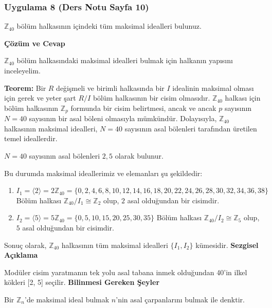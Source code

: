 \documentclass[11pt, a4paper]{article}
\newenvironment{cozum}{
    \vspace{0.5cm}
    \noindent\textcolor{green!60!black}{\faCheckCircle\enspace \textbf{\Large Çözüm ve Cevap}}\par\vspace{0.2cm}
}{}
\newenvironment{sezgisel}{
    \vspace{0.5cm}
    \noindent\textcolor{orange!80!black}{\faLightbulb\enspace \textbf{\Large Sezgisel Açıklama}}\par\vspace{0.2cm}
    \itshape
}{}
\newenvironment{bilgi}{
    \vspace{0.5cm}
    \noindent\textcolor{red!70!black}{\faExclamationTriangle\enspace \textbf{\Large Bilinmesi Gereken Şeyler}}\par\vspace{0.2cm}
}{}
\begin{document}
\subsubsection{Uygulama 8 (Ders Notu Sayfa 10)}
\begin{sorubox}
$\mathbb{Z}_{40}$ bölüm halkasının içindeki tüm maksimal idealleri bulunuz.
\end{sorubox}
\begin{cozum}
$\mathbb{Z}_{40}$ bölüm halkasındaki maksimal idealleri bulmak için halkanın yapısını inceleyelim.

\textbf{Teorem:} Bir $R$ değişmeli ve birimli halkasında bir $I$ idealinin maksimal olması için gerek ve yeter şart $R/I$ bölüm halkasının bir cisim olmasıdır. $\mathbb{Z}_{40}$ halkası için bölüm halkasının $\mathbb{Z}_p$ formunda bir cisim belirtmesi, ancak ve ancak $p$ sayısının $N = 40$ sayısının bir asal böleni olmasıyla mümkündür. Dolayısıyla, $\mathbb{Z}_{40}$ halkasının maksimal idealleri, $N = 40$ sayısının asal bölenleri tarafından üretilen temel ideallerdir.

$N = 40$ sayısının asal bölenleri $2, 5$ olarak bulunur.

Bu durumda maksimal ideallerimiz ve elemanları şu şekildedir:
\begin{enumerate}
    \item $I_{1} = \langle 2 \rangle = 2\mathbb{Z}_{40} = \{0, 2, 4, 6, 8, 10, 12, 14, 16, 18, 20, 22, 24, 26, 28, 30, 32, 34, 36, 38\}$
    Bölüm halkası $\mathbb{Z}_{40} / I_{1} \cong \mathbb{Z}_{2}$ olup, $2$ asal olduğundan bir cisimdir.
    \item $I_{2} = \langle 5 \rangle = 5\mathbb{Z}_{40} = \{0, 5, 10, 15, 20, 25, 30, 35\}$
    Bölüm halkası $\mathbb{Z}_{40} / I_{2} \cong \mathbb{Z}_{5}$ olup, $5$ asal olduğundan bir cisimdir.
\end{enumerate}

Sonuç olarak, $\mathbb{Z}_{40}$ halkasının tüm maksimal idealleri $\{I_1, I_2\}$ kümesidir.
\end{cozum}
\begin{sezgisel}
Modüler cisim yaratmanın tek yolu asal tabana inmek olduğundan 40'in ilkel kökleri [2, 5] seçilir.
\end{sezgisel}
\begin{bilgi}
Bir $\mathbb{Z}_n$'de maksimal ideal bulmak $n$'nin asal çarpanlarını bulmak ile denktir.
\end{bilgi}

\newpage
\end{document}

